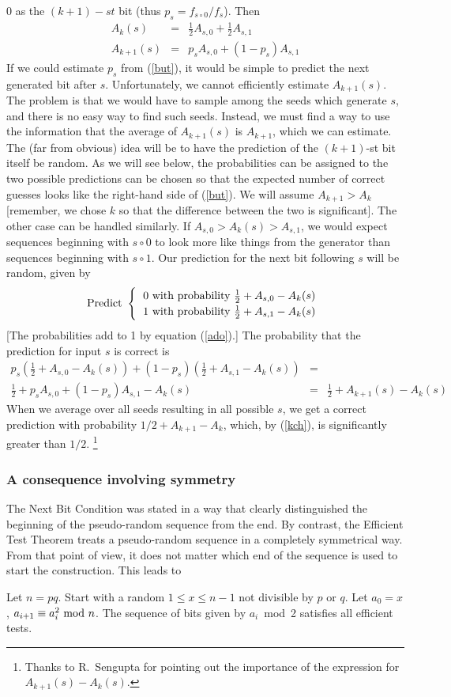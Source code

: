 0 as the $(k+1)-st$ bit (thus $p_s=f_{s\circ0}/f_s$).
Then \begin{eqnarray}A_k(s)&=&\frac12A_{s,0}+
\frac12A_{s,1}\label{ado}
\\A_{k+1}(s)&=&p_sA_{s,0}+(1-p_s)A_{s,1}\label{but}\end{eqnarray}
If we could estimate $p_s$ from (\ref{but}), it would be simple to predict
the next generated bit after $s$.  Unfortunately, we cannot efficiently
estimate $A_{k+1}(s)$.  The problem is that we would have to sample 
among the seeds which generate $s$, and there is no easy way to find
such seeds.  Instead, we must find a way to use the information that
the average of $A_{k+1}(s)$ is $A_{k+1}$, which we can estimate.
\pq The (far from obvious) idea will be to have the prediction of the
$(k+1)$-st bit itself be random.  As we will see below, the probabilities
can be assigned to the two possible predictions can be chosen so that
the expected number of correct guesses looks like the right-hand side
of (\ref{but}).
\pq We will assume $A_{k+1}>A_k$ [remember, we chose $k$ so that the
difference between the two is significant]. The other case can be
handled similarly.  If $A_{s,0}>A_k(s)>A_{s,1}$, we would
expect sequences beginning with $s\circ0$ to look more like things
from the generator than sequences beginning with $s\circ1$.  Our
prediction for the next bit following $s$ will be random, given by
$${\renewcommand{\arraystretch}{1.2}
\hbox{Predict }\left\{{}\begin{tabular}{l}
0 with probability $\frac12+A_{s,0}-A_k(s)$\\
1 with probability $\frac12+A_{s,1}-A_k(s)$\end{tabular}\right.}$$
[The probabilities add to 1 by equation (\ref{ado}).]\pq
The probability that the prediction for input $s$ is correct is
\begin{eqnarray*}p_s\left(\frac12+A_{s,0}-A_k(s)\right)+(1-p_s)\left(
\frac12+A_{s,1}-A_k(s)\right)&=\\ \frac12+p_sA_{s,0}+(1-p_s)A_{s,1}
-A_k(s)&=&\frac12+A_{k+1}(s)-A_k(s)\end{eqnarray*}
When we average over all seeds resulting in all possible $s$, we get 
a correct prediction with probability $1/2+A_{k+1}-A_k$, which,
by (\ref{kch}), is significantly greater than $1/2$.
\footnote{Thanks to R.\ Sengupta for pointing out the importance of the
expression for $A_{k+1}(s)-A_k(s)$.}
\subsubsection{A consequence involving symmetry}
The Next Bit Condition was stated in a way that clearly distinguished
the beginning of the pseudo-random sequence from the end.  By contrast,
the Efficient Test Theorem treats a pseudo-random sequence in a completely
symmetrical way.  From that point of view, it does not matter which
end of the sequence is used to start the construction. This leads to
\begin{Co}Let $n=pq$.  Start with a random $1\le x\le n-1$ not divisible
by $p$ or $q$.  Let $a_0=x$, $a_{i+1}\equiv a_i^2\hbox{ mod }n$.  The sequence of
bits given by $a_i$~mod~2 satisfies all efficient tests.\end{Co}


